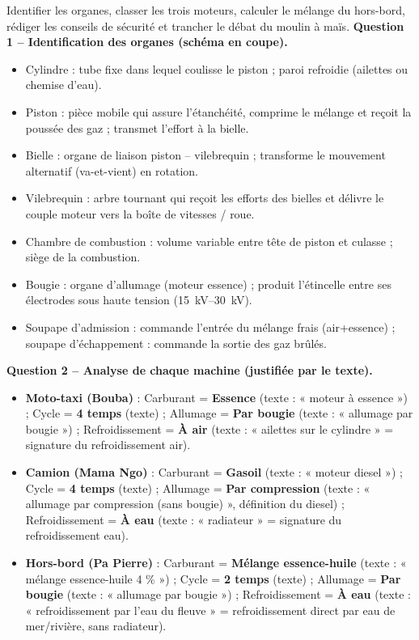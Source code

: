 \documentclass[11pt]{article}
\newcommand{\cle}[1]{{\popxbold\color{popdark}#1}}
\begin{document}
\begin{exoresolu}
Identifier les organes, classer les trois moteurs, calculer le mélange du hors-bord, rédiger les conseils de sécurité et trancher le débat du moulin à maïs.
\tcblower
\textbf{Question 1 -- Identification des organes (schéma en coupe).}
\begin{itemize}
\item \cle{Cylindre} : tube fixe dans lequel coulisse le piston ; paroi refroidie (ailettes ou chemise d'eau).
\item \cle{Piston} : pièce mobile qui assure l'étanchéité, comprime le mélange et reçoit la poussée des gaz ; transmet l'effort à la bielle.
\item \cle{Bielle} : organe de liaison piston -- vilebrequin ; transforme le mouvement alternatif (va-et-vient) en rotation.
\item \cle{Vilebrequin} : arbre tournant qui reçoit les efforts des bielles et délivre le couple moteur vers la boîte de vitesses / roue.
\item \cle{Chambre de combustion} : volume variable entre tête de piston et culasse ; siège de la combustion.
\item \cle{Bougie} : organe d'allumage (moteur essence) ; produit l'étincelle entre ses électrodes sous haute tension (\SIrange{15}{30}{kV}).
\item \cle{Soupape d'admission} : commande l'entrée du mélange frais (air+essence) ; \cle{soupape d'échappement} : commande la sortie des gaz brûlés.
\end{itemize}

\textbf{Question 2 -- Analyse de chaque machine (justifiée par le texte).}
\begin{itemize}
\item \textbf{Moto-taxi (Bouba)} : Carburant = \textbf{Essence} (texte : « moteur à essence ») ; Cycle = \textbf{4 temps} (texte) ; Allumage = \textbf{Par bougie} (texte : « allumage par bougie ») ; Refroidissement = \textbf{À air} (texte : « ailettes sur le cylindre » = signature du refroidissement air).
\item \textbf{Camion (Mama Ngo)} : Carburant = \textbf{Gasoil} (texte : « moteur diesel ») ; Cycle = \textbf{4 temps} (texte) ; Allumage = \textbf{Par compression} (texte : « allumage par compression (sans bougie) », définition du diesel) ; Refroidissement = \textbf{À eau} (texte : « radiateur » = signature du refroidissement eau).
\item \textbf{Hors-bord (Pa Pierre)} : Carburant = \textbf{Mélange essence-huile} (texte : « mélange essence-huile 4 \% ») ; Cycle = \textbf{2 temps} (texte) ; Allumage = \textbf{Par bougie} (texte : « allumage par bougie ») ; Refroidissement = \textbf{À eau} (texte : « refroidissement par l'eau du fleuve » = refroidissement direct par eau de mer/rivière, sans radiateur).
\end{itemize}


\end{exoresolu}
\end{document}
